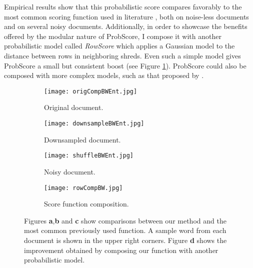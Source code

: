 \documentclass[letterpaper]{article}
\begin{document}
Empirical results show that this probabilistic score compares favorably to the most common scoring function used in literature \cite{P7}, both on noise-less documents and on several noisy documents. Additionally, in order to showcase the benefits offered by the modular nature of ProbScore, I compose it with another probabilistic model called \emph{RowScore} which applies a Gaussian model to the distance between rows in neighboring shreds. Even such a simple model gives ProbScore a small but consistent boost (see Figure \ref{fig:scoreComp}). ProbScore could also be composed with more complex models, such as that proposed by \cite{P8}.
\begin{figure}[h]
\setlength{\abovecaptionskip}{8pt plus 1.0pt minus 2.0pt}

    \centering
    \begin{subfigure}[b]{0.23\textwidth}
        \setlength{\abovecaptionskip}{4pt plus 1.0pt minus 2.0pt}
        \centering
        \texttt{[image: origCompBWEnt.jpg]}
        \caption{Original document.}
    \end{subfigure}
    \begin{subfigure}[b]{0.23\textwidth}
        \setlength{\abovecaptionskip}{4pt plus 1.0pt minus 2.0pt}
        \centering
        \texttt{[image: downsampleBWEnt.jpg]}
        \caption{Downsampled document.}
    \end{subfigure}
    \begin{subfigure}[b]{0.23\textwidth}
        \setlength{\abovecaptionskip}{4pt plus 1.0pt minus 2.0pt}
        \centering
        \texttt{[image: shuffleBWEnt.jpg]}
        \caption{Noisy document.}
    \end{subfigure}
    \begin{subfigure}[b]{0.23\textwidth}
        \setlength{\abovecaptionskip}{4pt plus 1.0pt minus 2.0pt}
        \centering
        \texttt{[image: rowCompBW.jpg]}
        \caption{Score function composition.}
    \end{subfigure}
     \caption{Figures {\bf a},{\bf b} and {\bf c} show comparisons between our method and the most common previously used function. A sample word from each document is shown in the upper right corners. Figure {\bf d} shows the improvement obtained by composing our function with another probabilistic model.}
    \label{fig:scoreComp}
\end{figure}
\end{document}
